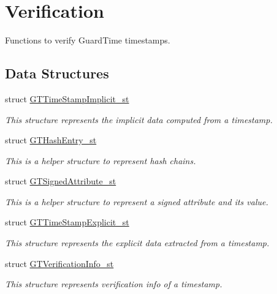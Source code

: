 \hypertarget{group__verification}{
\section{Verification}
\label{group__verification}
}


Functions to verify GuardTime timestamps.  


\subsection*{Data Structures}
\begin{DoxyCompactItemize}
\item 
struct \hyperlink{struct_g_t_time_stamp_implicit__st}{GTTimeStampImplicit\_\-st}
\begin{DoxyCompactList}\small\item\em This structure represents the implicit data computed from a timestamp. \item\end{DoxyCompactList}\item 
struct \hyperlink{struct_g_t_hash_entry__st}{GTHashEntry\_\-st}
\begin{DoxyCompactList}\small\item\em This is a helper structure to represent hash chains. \item\end{DoxyCompactList}\item 
struct \hyperlink{struct_g_t_signed_attribute__st}{GTSignedAttribute\_\-st}
\begin{DoxyCompactList}\small\item\em This is a helper structure to represent a signed attribute and its value. \item\end{DoxyCompactList}\item 
struct \hyperlink{struct_g_t_time_stamp_explicit__st}{GTTimeStampExplicit\_\-st}
\begin{DoxyCompactList}\small\item\em This structure represents the explicit data extracted from a timestamp. \item\end{DoxyCompactList}\item 
struct \hyperlink{struct_g_t_verification_info__st}{GTVerificationInfo\_\-st}
\begin{DoxyCompactList}\small\item\em This structure represents verification info of a timestamp. \item\end{DoxyCompactList}\end{DoxyCompactItemize}
